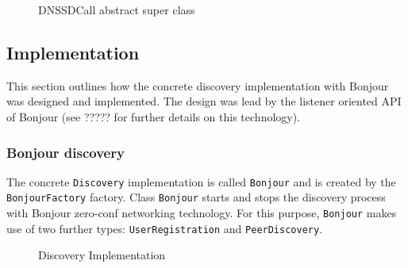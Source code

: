 \begin{figure}[H]
 \centering
 \caption{DNSSDCall abstract super class}
 \label{fig:network.discovery.manager}
\end{figure}


\subsection{Implementation}
This section outlines how the concrete discovery implementation with Bonjour was designed and implemented. The design was lead by the listener oriented API of Bonjour (see ????? for further details on this technology).

\subsubsection{Bonjour discovery}
The concrete \texttt{Discovery} implementation is called \texttt{Bonjour} and is created by the \texttt{BonjourFactory} factory. Class \texttt{Bonjour} starts and stops the discovery process with Bonjour zero-conf networking technology. For this purpose,  \texttt{Bonjour} makes use of two further types:  \texttt{UserRegistration} and \texttt{PeerDiscovery}.

\begin{figure}[htb]
 \centering
 \caption{Discovery Implementation}
 \label{fig:network.discovery.implementation}
\end{figure}

